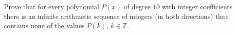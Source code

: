Prove that for every polynomial $P(x)$ of degree $10$ with integer coefficients
there is an infinite arithmetic sequence of integers (in both directions)
that contains none of the values $P(k)$, $k\in \mathbb{Z}$.